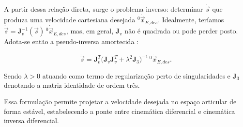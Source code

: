 A partir dessa relação direta, surge o problema inverso:
determinar $\dot{\vec{s}}$ que produza uma velocidade cartesiana desejada ${}^{0}\!\dot{\vec{x}}_{E,des}$.
Idealmente, teríamos
$\dot{\vec{s}} = \mathbf{J}_{v}^{-1}(\vec{s})\,{}^{0}\!\dot{\vec{x}}_{E,des}$,
mas, em geral, $\mathbf{J}_{v}$ não é quadrada ou pode perder posto.
Adota-se então a pseudo-inversa amortecida \cite{sciavicco_siciliano2010}:

\begin{equation}
\label{eq_pseudoinversa_preIK}
\dot{\vec{s}}
=
\mathbf{J}_{v}^{T}
\bigl(
\mathbf{J}_{v}\mathbf{J}_{v}^{T}
+
\lambda^{2}\mathbf{J}_{3}
\bigr)^{-1}
\,{}^{0}\!\dot{\vec{x}}_{E,des}.
\end{equation}

Sendo $\lambda > 0$ atuando como termo de regularização perto de singularidades e $\mathbf{J}_{3}$ denotando a matriz identidade de ordem três.


Essa formulação permite projetar a velocidade desejada no espaço articular de forma estável, estabelecendo a ponte entre cinemática diferencial e cinemática inversa diferencial.
